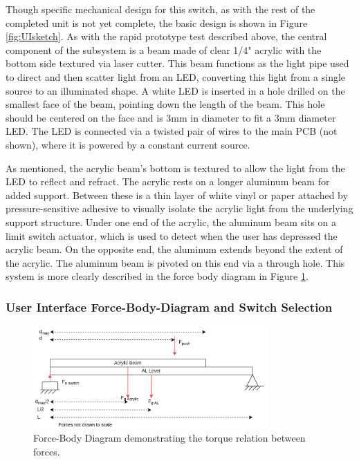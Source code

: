 \documentclass{article}
\begin{document}
	Though specific mechanical design for this switch, as with the rest of the completed unit is not yet complete, the basic design is shown in Figure \ref{fig:UIsketch}.  As with the rapid prototype test described above, the central component of the subsystem is a beam made of clear 1/4" acrylic with the bottom side textured via laser cutter.  This beam functions as the light pipe used to direct and then scatter light from an LED, converting this light from a single source to an illuminated shape.  A white LED is inserted in a hole drilled on the smallest face of the beam, pointing down the length of the beam.  This hole should be centered on the face and is 3mm in diameter to fit a 3mm diameter LED.  The LED is connected via a twisted pair of wires to the main PCB (not shown), where it is powered by a constant current source.

	As mentioned, the acrylic beam's bottom is textured to allow the light from the LED to reflect and refract.  The acrylic rests on a longer aluminum beam for added support.  Between these is a thin layer of white vinyl or paper attached by pressure-sensitive adhesive to visually isolate the acrylic light from the underlying support structure.  Under one end of the acrylic, the aluminum beam sits on a limit switch actuator, which is used to detect when the user has depressed the acrylic beam.  On the opposite end, the aluminum extends beyond the extent of the acrylic.  The aluminum beam is pivoted on this end via a through hole.  This system is more clearly described in the force body diagram in Figure \ref{fig:UIFBD}.

	\subsubsection{User Interface Force-Body-Diagram and Switch Selection}

	\begin{figure}
		\centering
		\includegraphics[width = 0.8\textwidth]{PR4Images/UIFBD.png}
		\caption{Force-Body Diagram demonstrating the torque relation between forces.}
		\label{fig:UIFBD}
	\end{figure}
\end{document}
